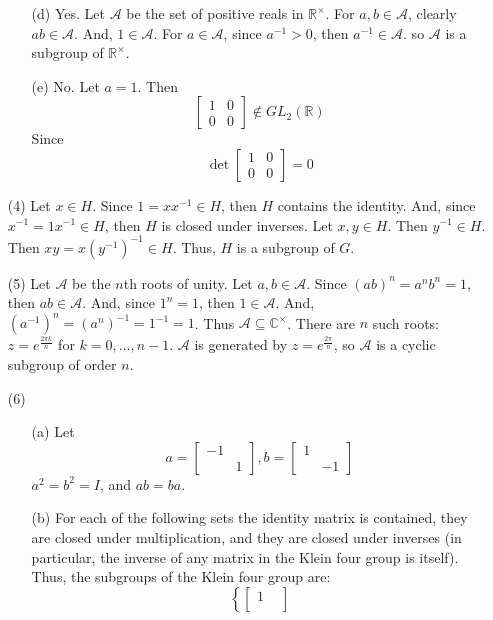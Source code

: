 \documentclass[12pt]{article}
\begin{document}
\begin{itemize}
\begin{itemize}
\item[(d)]Yes. Let $\mathcal{A}$ be the set of positive reals in $\mathbb{R}^\times$. For $a, b \in \mathcal{A}$, clearly $ab \in \mathcal{A}$. And, $1 \in \mathcal{A}$. For $a \in \mathcal{A}$, since $a^{-1} > 0$, then $a^{-1} \in \mathcal{A}$. so $\mathcal{A}$ is a subgroup of $\mathbb{R}^\times$.
\item[(e)] No. Let $a = 1$. Then
$$\begin{bmatrix}
1 & 0 \\
0 & 0
\end{bmatrix} \not \in GL_2(\mathbb{R})$$
Since
$$\det\begin{bmatrix}
1 & 0 \\
0 & 0
\end{bmatrix} = 0$$
\end{itemize}
\item[(4)]
Let $x \in H$. Since $1 = xx^{-1} \in H$, then $H$ contains the identity. And, since $x^{-1} = 1x^{-1} \in H$, then $H$ is closed under inverses. Let $x, y \in H$. Then $y^{-1} \in H$. Then $xy = x(y^{-1})^{-1} \in H$. Thus, $H$ is a subgroup of $G$.
\item[(5)]
Let $\mathcal{A}$ be the $n$th roots of unity. Let $a, b \in \mathcal{A}$. Since $(ab)^n = a^nb^n = 1$, then $ab \in \mathcal{A}$. And, since $1^n = 1$, then $1 \in \mathcal{A}$. And, $(a^{-1})^n = (a^n)^{-1} = 1^{-1} = 1$. Thus $\mathcal{A} \subseteq \mathbb{C}^\times$. There are $n$ such roots: $z = e^{\frac{2\pi k}{n}}$ for $k = 0, ..., n - 1$. $\mathcal{A}$ is generated by $z = e^{\frac{2\pi}{n}}$, so $\mathcal{A}$ is a cyclic subgroup of order $n$.
\item[(6)]
\begin{itemize}
\item[(a)]
Let
$$a = \begin{bmatrix}
-1 & \\
& 1
\end{bmatrix}, b = \begin{bmatrix}
1 & \\
& -1
\end{bmatrix}$$
$a^2 = b^2 = I$, and $ab = ba$.
\item[(b)]
For each of the following sets the identity matrix is contained, they are closed under multiplication, and they are closed under inverses (in particular, the inverse of any matrix in the Klein four group is itself). Thus, the subgroups of the Klein four group are:
$$\left\lbrace \begin{bmatrix}
1 & \\

\end{bmatrix}$$
\end{itemize}
\end{itemize}
\end{document}
